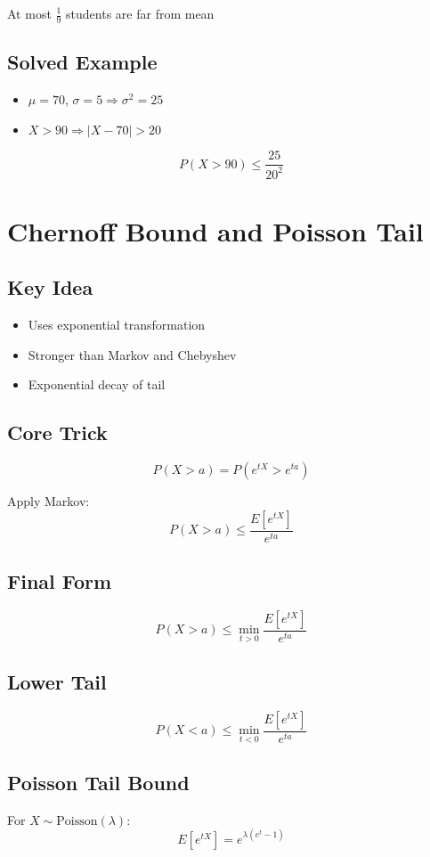 \documentclass[11pt]{article}
\begin{document}
At most $\frac{1}{9}$ students are far from mean

\subsection{Solved Example}
\begin{itemize}
\item $\mu = 70$, $\sigma = 5 \Rightarrow \sigma^2 = 25$
\item $X > 90 \Rightarrow |X - 70| > 20$
\end{itemize}

\[
P(X > 90) \leq \frac{25}{20^2}
\]

\section{Chernoff Bound and Poisson Tail}

\subsection{Key Idea}
\begin{itemize}
\item Uses exponential transformation
\item Stronger than Markov and Chebyshev
\item Exponential decay of tail
\end{itemize}

\subsection{Core Trick}
\[
P(X > a) = P(e^{tX} > e^{ta})
\]

Apply Markov:
\[
P(X > a) \leq \frac{E[e^{tX}]}{e^{ta}}
\]

\subsection{Final Form}
\[
P(X > a) \leq \min_{t>0} \frac{E[e^{tX}]}{e^{ta}}
\]

\subsection{Lower Tail}
\[
P(X < a) \leq \min_{t<0} \frac{E[e^{tX}]}{e^{ta}}
\]

\subsection{Poisson Tail Bound}
For $X \sim \text{Poisson}(\lambda)$:
\[
E[e^{tX}] = e^{\lambda(e^t - 1)}
\]
\end{document}
